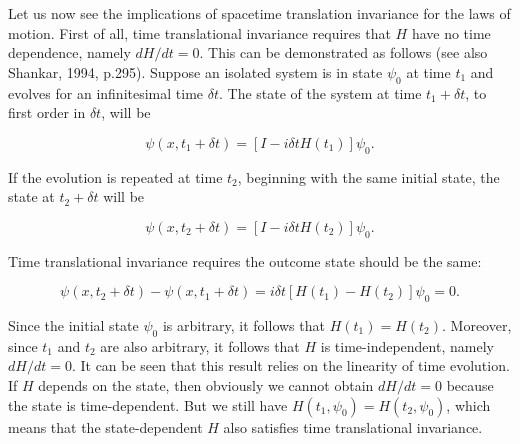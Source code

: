 Let us now see the implications of spacetime translation invariance for the laws of motion. First of all, time translational invariance requires that $H$ have no time dependence, namely $dH/dt=0$. This can be demonstrated as follows (see also Shankar, 1994, p.295). Suppose an isolated system is in state $\psi_0$ at time $t_1$ and evolves for an infinitesimal time $\delta t$. The state of the system at time $t_1+\delta t$, to first order in $\delta t$, will be  

\begin{equation}
\psi (x,t_1+\delta t)=[I-i\delta t H(t_1)]\psi_0.
\label{}
\end{equation}

\noindent  If the evolution is repeated at time $t_2$, beginning with the same initial state, the state at $t_2+\delta t$ will be

\begin{equation}
\psi (x,t_2+\delta t)=[I-i\delta t H(t_2)]\psi_0 .
\label{}
\end{equation}

\noindent  Time translational invariance requires the outcome state should be the same:

\begin{equation}
\psi (x,t_2+\delta t)-\psi (x,t_1+\delta t)=i\delta t [H(t_1)-H(t_2)]\psi_0=0.
\label{}
\end{equation}

\noindent  Since the initial state $\psi_0$ is arbitrary, it follows that $H(t_1)=H(t_2)$. Moreover, since $t_1$ and $t_2$ are also arbitrary, it follows that $H$ is time-independent, namely $dH/dt=0$. It can be seen that this result relies on the linearity of time evolution. If $H$ depends on the state, then obviously we cannot obtain $dH/dt=0$ because the state is time-dependent. But we still have $H(t_1,\psi_0)=H(t_2,\psi_0)$, which means that the state-dependent $H$ also satisfies time translational invariance.

